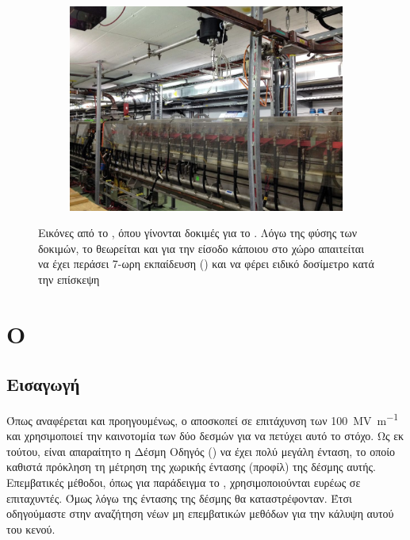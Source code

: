 \begin{figure}[tph]
\begin{subfigure}{0.5\textwidth}
    \end{subfigure}        
	~
    \begin{subfigure}{0.5\textwidth}
		\centering
		\includegraphics[width=.9\linewidth]{images/CLIC-CTF3-img4.jpg}
    \end{subfigure}
    
\caption[Εικόνες από το ]
{Εικόνες από το , όπου γίνονται δοκιμές για το . 
Λόγω της φύσης των δοκιμών, το  θεωρείται  και για την είσοδο κάποιου στο χώρο απαιτείται να έχει περάσει 7-ωρη εκπαίδευση () και να φέρει ειδικό δοσίμετρο κατά την επίσκεψη}
\label{img:CLIC-CTF3}        
\end{figure}

\section{Ο }

\subsection{Εισαγωγή}

Όπως αναφέρεται και προηγουμένως, ο  αποσκοπεί σε επιτάχυνση των \SI[per-mode = symbol]{100}{\mega \volt \per \metre} και χρησιμοποιεί την καινοτομία των δύο δεσμών για να πετύχει αυτό το στόχο. 
Ως εκ τούτου, είναι απαραίτητο η Δέσμη Οδηγός () να έχει πολύ μεγάλη ένταση, το οποίο καθιστά πρόκληση τη μέτρηση της χωρικής έντασης (προφίλ) της δέσμης αυτής. 
Επεμβατικές μέθοδοι, όπως για παράδειγμα το , χρησιμοποιούνται ευρέως σε επιταχυντές. Όμως λόγω της έντασης της δέσμης θα καταστρέφονταν. 
Έτσι οδηγούμαστε στην αναζήτηση νέων μη επεμβατικών μεθόδων για την κάλυψη αυτού του κενού.

